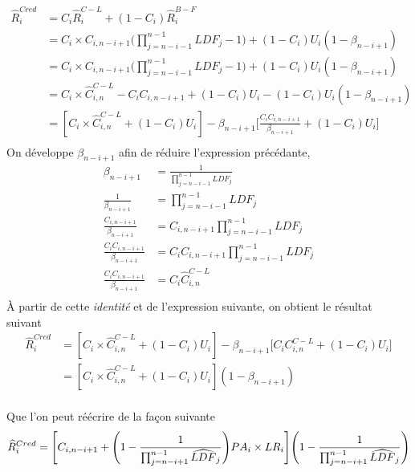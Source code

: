 \begin{align*}
\widehat{R}_i^{Cred} &= C_i \widehat{R}_i^{C-L} + (1 - C_i) \widehat{R}_i^{B-F} \\
&= C_i \times C_{i, n-i+1} \Bigg( \prod_{j=n-i-1}^{n-1} LDF_j - 1 \Bigg) + (1 - C_i) U_i (1 - \beta_{n-i+1}) \\
&= C_i \times C_{i, n-i+1} \Bigg( \prod_{j=n-i-1}^{n-1} LDF_j - 1 \Bigg) + (1 - C_i) U_i (1 - \beta_{n-i+1}) \\
&=C_i \times \widehat{C}_{i, n}^{C-L} - C_i C_{i, n-i+1}  + (1 - C_i) U_i - (1 - C_i)U_i (1 - \beta_{n-i+1}) \\
&= [C_i \times \widehat{C}_{i, n}^{C-L} + (1 - C_i) U_i] - \beta_{n-i+1}\Bigg[ \frac{C_i C_{i, n-i+1}}{\beta_{n-i+1} } + (1 - C_i)U_i\Bigg] \\
\end{align*}
On développe $\beta_{n-i+1}$ afin de réduire l'expression précédante,
\begin{align*}
\beta_{n-i+1} &= \frac{1}{\prod_{j=n-i-1}^{n-1} LDF_j} \\
\frac{1}{\beta_{n-i+1}} &= \prod_{j=n-i-1}^{n-1} LDF_j \\
\frac{C_{i, n-i+1}}{\beta_{n-i+1}} &= C_{i, n-i+1} \prod_{j=n-i-1}^{n-1} LDF_j \\
\frac{C_i C_{i, n-i+1}}{\beta_{n-i+1}} &= C_i C_{i, n-i+1} \prod_{j=n-i-1}^{n-1} LDF_j \\
\frac{C_i C_{i, n-i+1}}{\beta_{n-i+1}} &= C_i \widehat{C}_{i, n}^{C-L} \\
\end{align*}
À partir de cette \textit{identité} et de l'expression suivante, on obtient le résultat suivant
\begin{align*}
\widehat{R}_i^{Cred} &= [C_i \times \widehat{C}_{i, n}^{C-L} + (1 - C_i) U_i] - \beta_{n-i+1} \Bigg[ C_i C_{i, n}^{C-L}  + (1 - C_i)U_i \Bigg] \\
&= [C_i \times \widehat{C}_{i, n}^{C-L} + (1 - C_i) U_i] ( 1 - \beta_{n-i+1}) \\
\end{align*}

Que l'on peut réécrire de la façon suivante
\begin{equation}
\widehat{R}_i^{Cred} = \Bigg[C_{i, n - i + 1} + \Bigg(1 - \frac{1}{\prod_{j = n - i + 1}^{n- 1} \widehat{LDF}_j} \Bigg) PA_i \times LR_i \Bigg] \Bigg(1 - \frac{1}{\prod_{j = n - i + 1}^{n- 1} \widehat{LDF}_j} \Bigg) \\
\end{equation}


